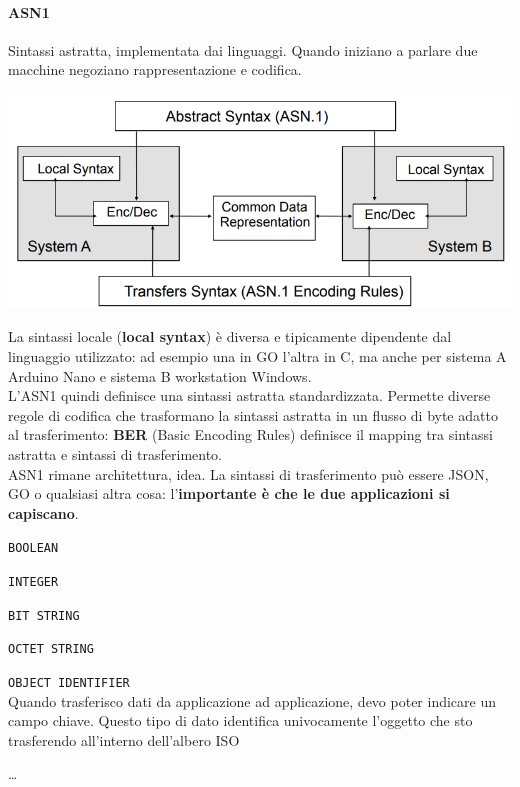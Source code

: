 \documentclass[10pt]{book}
\begin{document}
\paragraph{ASN1} Sintassi astratta, implementata dai linguaggi. Quando iniziano a parlare due macchine negoziano rappresentazione e codifica.
\begin{center}
	\includegraphics[scale=0.7]{asn1.png}
\end{center}
La sintassi locale (\textbf{local syntax}) è diversa e tipicamente dipendente dal linguaggio utilizzato: ad esempio una in GO l'altra in C, ma anche per sistema A Arduino Nano e sistema B workstation Windows.\\
L'ASN1 quindi definisce una sintassi astratta standardizzata. Permette diverse regole di codifica che trasformano la sintassi astratta in un flusso di byte adatto al trasferimento: \textbf{BER} (Basic Encoding Rules) definisce il mapping tra sintassi astratta e sintassi di trasferimento.\\
ASN1 rimane architettura, idea. La sintassi di trasferimento può essere JSON, GO o qualsiasi altra cosa: l'\textbf{importante è che le due applicazioni si capiscano}.
\begin{list}{}{I \textbf{tipi di dato} (datatypes) primitivi dell'ASN1 sono:}
	\item \texttt{BOOLEAN}
	\item \texttt{INTEGER}
	\item \texttt{BIT STRING}
	\item \texttt{OCTET STRING}
	\item \texttt{OBJECT IDENTIFIER}\\
	Quando trasferisco dati da applicazione ad applicazione, devo poter indicare un campo chiave. Questo tipo di dato identifica univocamente l'oggetto che sto trasferendo all'interno dell'albero ISO
	\item \ldots
\end{list}
\end{document}
